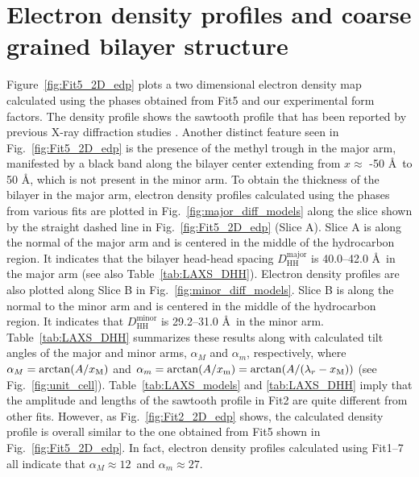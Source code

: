 \newpage
\section{Electron density profiles and coarse grained bilayer structure}\label{sec:LAXS_edp}
Figure~\ref{fig:Fit5_2D_edp} plots a two dimensional electron density map calculated
using the phases obtained from Fit5 and our experimental form factors.
The density profile shows the sawtooth profile that has been reported by
previous X-ray diffraction studies \cite{ref:Sun96,ref:Sengupta03,ref:Pabst04}.
Another distinct feature seen in Fig.~\ref{fig:Fit5_2D_edp} is the 
presence of the methyl trough in the major arm, 
manifested by a black band along the bilayer center extending from 
$x \approx$ -50 \AA\ to 50 \AA, which is not present in the minor arm.
To obtain the thickness of the bilayer in the major arm, 
electron density profiles calculated
using the phases from various fits are 
plotted in Fig.~\ref{fig:major_diff_models} 
along the slice shown by the straight dashed line in Fig.~\ref{fig:Fit5_2D_edp}
(Slice A).
Slice A is along the normal of the major arm and is centered in the middle of 
the hydrocarbon region. It indicates that the bilayer head-head spacing 
$D_\text{HH}^\text{major}$ is 40.0--42.0 \AA\ in the major arm
(see also Table~\ref{tab:LAXS_DHH}). 
Electron density profiles are also plotted along Slice B
in Fig.~\ref{fig:minor_diff_models}.
Slice B is
along the normal to the minor arm and is centered in the middle of the
hydrocarbon region. It indicates that $D_\text{HH}^\text{minor}$ is
29.2--31.0 \AA\ in the minor arm.
Table~\ref{tab:LAXS_DHH} summarizes these results along with calculated
tilt angles of the major and minor arms, $\alpha_M$ and $\alpha_m$, respectively,
where $\alpha_M=\arctan(A/x_\textrm{M})$ and $\alpha_m=\arctan(A/x_\textrm{m})=\arctan(A/(\lambda_r-x_\textrm{M}))$
(see Fig.~\ref{fig:unit_cell}). Table~\ref{tab:LAXS_models} and \ref{tab:LAXS_DHH}
imply that the amplitude and lengths of the sawtooth profile in Fit2 are 
quite different from other fits. However, as Fig.~\ref{fig:Fit2_2D_edp} shows,
the calculated density profile is overall similar to the one obtained from Fit5
shown in Fig.~\ref{fig:Fit5_2D_edp}. In fact, electron density profiles calculated
using Fit1--7 all indicate that $\alpha_M \approx 12$\textdegree\ and
$\alpha_m \approx 27$\textdegree. 


